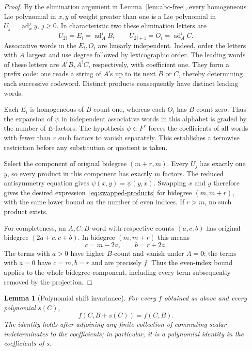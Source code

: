 \documentclass[11pt]{article}
\DeclareMathOperator{\ad}{ad}
\newtheorem{lemma}[theorem]{Lemma}
\theoremstyle{definition}
\theoremstyle{remark}
\numberwithin{equation}{section}
\begin{document}
\begin{proof}
By the elimination argument in Lemma~\ref{lem:abc-free}, every
homogeneous Lie polynomial in $x,y$ of weight greater than one is a
Lie polynomial in $U_j=\ad_x^j y$, $j\geq0$.
In characteristic two these elimination letters are
\[
 U_{2i}=E_i=\ad_A^i B,
 \qquad
 U_{2i+1}=O_i=\ad_A^i C.
\]
Associative words in the $E_i,O_i$ are linearly independent.
Indeed, order the letters with $A$ largest and use degree followed
by lexicographic order.  The leading words of these letters are
$A^iB,A^iC$, respectively, with coefficient one.
They form a prefix code: one reads a string of $A$'s up to its
next $B$ or $C$, thereby determining each successive codeword.
Distinct products consequently have distinct leading words.

Each $E_i$ is homogeneous of $B$-count one, whereas each $O_i$
has $B$-count zero.  Thus the expansion of $\psi$ in independent
associative words in this alphabet is graded by the number of
$E$-factors.  The hypothesis $\psi\in F^r$ forces the coefficients
of all words with fewer than $r$ such factors to vanish separately.
This establishes a termwise restriction before any substitution
or quotient is taken.

Select the component of original bidegree $(m+r,m)$.
Every $U_j$ has exactly one $y$, so every product in this component
has exactly $m$ factors.  The reduced antisymmetry equation gives
$\psi(x,y)=\psi(y,x)$.  Swapping $x$ and $y$ therefore gives
the desired expression~\eqref{eq:swapped-products} for bidegree
$(m,m+r)$, with the same lower bound on the number of even indices.
If $r>m$, no such product exists.

For completeness, an $A,C,B$-word with respective counts $(a,c,b)$
has original bidegree $(2a+c,c+b)$.  In bidegree $(m,m+r)$ this means
\begin{equation}
 \label{eq:bidegree-counts}
 c=m-2a,\qquad b=r+2a.
\end{equation}
The terms with $a>0$ have higher $B$-count and vanish under $A=0$;
the terms with $a=0$ have $c=m,b=r$ and are precisely $f$.
Thus the even-index bound applies to the whole bidegree component,
including every term subsequently removed by the projection.
\end{proof}

\begin{lemma}[Polynomial shift invariance]
\label{lem:shift-invariance}
For every $f$ obtained as above and every polynomial $s(C)$,
\begin{equation}
 \label{eq:polynomial-shift}
 f(C,B+s(C))=f(C,B).
\end{equation}
The identity holds after adjoining any finite collection of
commuting scalar indeterminates to the coefficients; in particular,
it is a polynomial identity in the coefficients of $s$.
\end{lemma}
\end{document}
